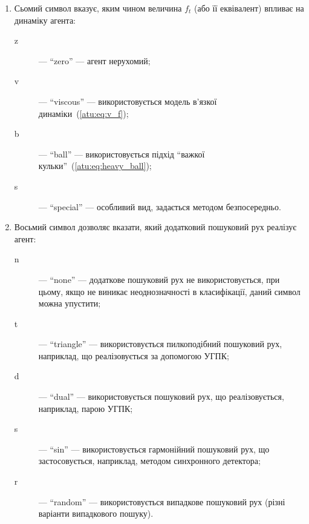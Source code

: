 \begin{enumerate}
\begin{description}
    \end{description}

  \item
    Сьомий символ
    вказує, яким чином величина $f_t$ (або її еквівалент) впливає на динаміку агента:
    \begin{description}

      \item[z]  --- ``zero'' ---
        агент нерухомий;

      \item[v] --- ``viscous'' ---
        використовується модель в'язкої динаміки~(\ref{atu:eq:v_f});

      \item[b] --- ``ball'' ---
        використовується підхід ``важкої кульки''~(\ref{atu:eq:heavy_ball});

      \item[s] --- ``special'' ---
        особливий вид, задається методом безпосередньо.

    \end{description}

  \item
    Восьмий символ дозволяє вказати,
    який додатковий пошуковий рух реалізує агент:
    \begin{description}

      \item[n]  --- ``none'' ---
        додаткове пошуковий рух не використовується, при цьому, якщо
        не виникає неоднозначності в класифікації, даний символ можна
        упустити;

      \item[t] --- ``triangle'' ---
        використовується пилкоподібний пошуковий рух, наприклад, що
        реалізовується за допомогою УГПК;

      \item[d] --- ``dual'' ---
        використовується пошуковий рух, що реалізовується, наприклад,
        парою УГПК;

      \item[s] --- ``sin'' ---
        використовується гармонійний пошуковий рух, що застосовується,
        наприклад, методом синхронного детектора;

      \item[r] --- ``random'' ---
        використовується випадкове пошуковий рух (різні варіанти
        випадкового пошуку).

    \end{description}



\end{enumerate}
